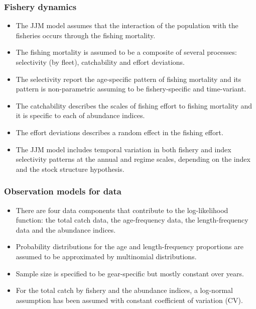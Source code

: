 \documentclass{article}
\begin{document}
\subsubsection{Fishery dynamics}

\begin{itemize}

\item The JJM model assumes that the interaction of the population with the fisheries occurs through the fishing mortality. 
    
\item The fishing mortality is assumed to be a composite of several processes: selectivity (by fleet), catchability and effort deviations.

\item The selectivity report the age-specific pattern of fishing mortality and its pattern is non-parametric assuming to be fishery-specific and time-variant.

\item The catchability describes the scales of fishing effort to fishing mortality and it is specific to each of abundance indices.
    
\item The effort deviations describes a random effect in the fishing effort.

\item The JJM model includes temporal variation in both fishery and index selectivity patterns at the annual and regime scales, depending on the index and the stock structure hypothesis.
\end{itemize}

\subsubsection{Observation models for data}

\begin{itemize}

\item There are four data components that contribute to the log-likelihood
function: the total catch data, the age-frequency data, the length-frequency data and the abundance indices.

\item Probability distributions for the age and length-frequency proportions are assumed to be approximated by multinomial distributions.

\item Sample size is specified to be gear-specific but mostly constant over years.

\item For the total catch by fishery and the abundance indices, a log-normal assumption has been assumed with constant coefficient of variation (CV).

\end{itemize}
\end{document}

